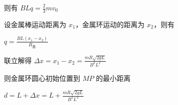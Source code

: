 \documentclass[\gkver]{gaokaozhenti}
\begin{document}
\begin{enumerate}
{则有 $BLq = \frac{2}{3}mv_{0}$

设金属棒运动距离为 $x_{1}$，金属环运动的距离为 $x_{2}$，则有

$q = \frac{BL(x_{1} - x_{2})}{R_{\text{总}}}$

联立解得 $\Delta x = x_{1} - x_{2} = \frac{mR\sqrt{2gL}}{B^{2}L^{2}}$

则金属环圆心初始位置到 $MP$ 的最小距离

$d = L + \Delta x = L + \frac{mR\sqrt{2gL}}{B^{2}L^{2}}$
}

\end{enumerate}
\end{document}
